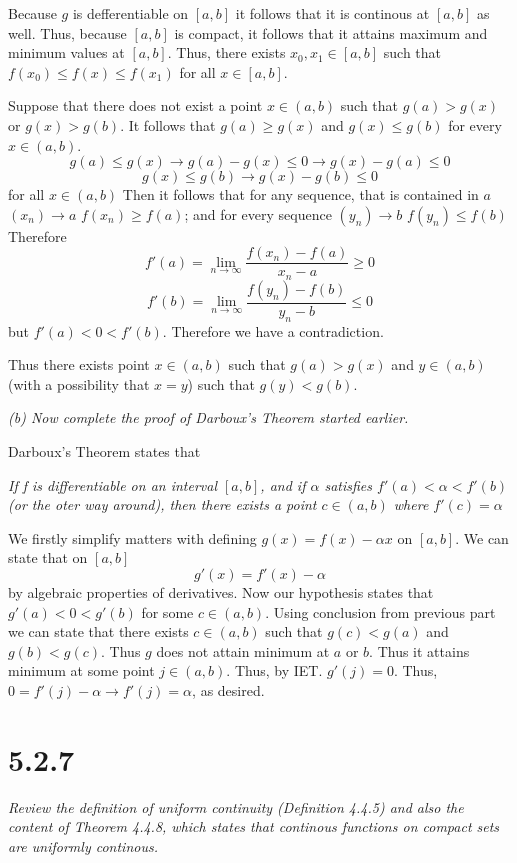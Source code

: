 \documentclass[11pt,oneside,titlepage]{book}
\begin{document}
Because $g$ is defferentiable on $[a, b]$ it follows that it is continous
at $[a, b]$ as well. Thus, because $[a, b]$ is compact, it follows that
it attains maximum and minimum values at $[a, b]$. Thus, there exists
$x_0, x_1 \in [a, b]$ such that $f(x_0) \leq f(x) \leq f(x_1)$ for
all $x \in [a, b]$.

Suppose that there does not exist a point $x \in (a, b)$ such that
$g(a) > g(x)$ or $g(x) > g(b)$.
It follows that
$g(a) \geq g(x)$ and $g(x) \leq g(b)$ for every $x \in (a, b)$.
$$g(a) \leq g(x) \to g(a) - g(x) \leq 0 \to g(x) - g(a) \leq 0 $$
$$g(x) \leq g(b) \to g(x) - g(b) \leq 0 $$
for all $x \in (a, b)$ Then it
follows that for any sequence, that is contained in $a$
$(x_n) \to a$ $f(x_n) \geq f(a)$; and for every sequence $(y_n) \to b$
$f(y_n) \leq f(b)$
Therefore
$$f'(a) = \lim_{n \to \infty} \frac{f(x_n) - f(a)}{x_n - a} \geq 0$$
$$f'(b) = \lim_{n \to \infty} \frac{f(y_n) - f(b)}{y_n - b} \leq 0$$
but $f'(a) < 0 < f'(b)$. Therefore we have a contradiction.

Thus there exists point $x \in (a, b)$ such that $g(a) > g(x)$ and
$y \in (a, b)$ (with a possibility that $x = y$) such that $g(y) < g(b)$.

\textit{(b) Now complete the proof of Darboux's Theorem started earlier.}

Darboux's Theorem states that

\textit{If f is differentiable on an interval $[a, b]$, and if $\alpha$
  satisfies $f'(a) < \alpha < f'(b)$ (or the oter way around), then there
  exists a point $c \in (a, b)$ where $f'(c) = \alpha$}

We firstly simplify  matters with defining $g(x) = f(x) - \alpha x$ on
$[a, b]$. We can state that on $[a, b]$
$$g'(x)  = f'(x) - \alpha$$
by algebraic properties of derivatives. Now our hypothesis states that
$g'(a) < 0 < g'(b)$ for some $c \in (a, b)$. Using conclusion from
previous part we can state that there exists $c \in (a, b)$ such that
$g(c) < g(a)$ and $g(b) < g(c)$. Thus $g$ does not attain minimum at
$a$ or $b$. Thus it attains minimum at some point $j \in (a, b)$. Thus, by
IET. $g'(j) = 0$. Thus, $0  = f'(j) - \alpha \to f'(j) = \alpha$, as desired.

\section*{5.2.7}
\textit{Review the definition of uniform continuity (Definition 4.4.5)
  and also the content of
  Theorem 4.4.8, which states that continous functions on compact sets are
  uniformly continous.}
\end{document}
